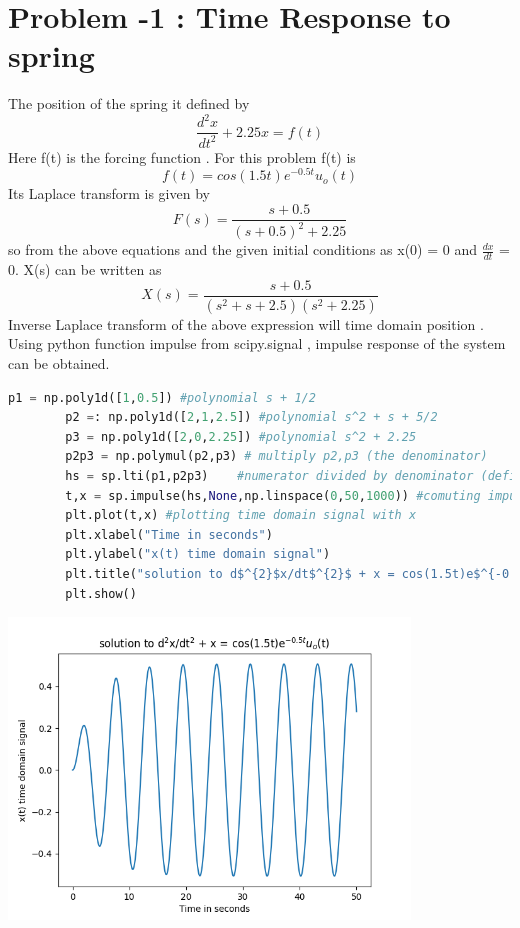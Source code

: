 \documentclass[a4paper]{article}
\begin{document}
\section{Problem -1 : Time Response to spring}
The position of the spring it defined by 
$$ \frac{d^{2}x}{dt^{2}} + 2.25x = f(t) $$
Here f(t) is the forcing function . For this problem f(t) is
$$ f(t) = cos(1.5t)e^{-0.5t}u_{o}(t) $$
Its Laplace transform is given by
$$ F(s) = \frac{s + 0.5}{(s + 0.5)^{2} + 2.25}$$
so from the above equations and the given initial conditions as x(0) = 0 and $\frac{dx}{dt}$ = 0.
X(s) can be written as
$$ X(s) = \frac{s + 0.5}{(s^{2} + s + 2.5)(s^{2} + 2.25)}$$
Inverse Laplace transform of the above expression will time domain position . Using python function impulse from scipy.signal , impulse response of the system can be obtained.  
\begin{lstlisting}[language=Python]
p1 = np.poly1d([1,0.5]) #polynomial s + 1/2
		p2 =: np.poly1d([2,1,2.5]) #polynomial s^2 + s + 5/2
		p3 = np.poly1d([2,0,2.25]) #polynomial s^2 + 2.25
		p2p3 = np.polymul(p2,p3) # multiply p2,p3 (the denominator)
		hs = sp.lti(p1,p2p3)	#numerator divided by denominator (defining transfer funtion)
		t,x = sp.impulse(hs,None,np.linspace(0,50,1000)) #comuting impulse response of the s domain transfer function
		plt.plot(t,x) #plotting time domain signal with x
		plt.xlabel("Time in seconds")
		plt.ylabel("x(t) time domain signal")
		plt.title("solution to d$^{2}$x/dt$^{2}$ + x = cos(1.5t)e$^{-0.5t}u_{o}$(t)")
		plt.show()
\end{lstlisting}
\begin{center}
\includegraphics[width=0.8\textwidth]{Figure_1.png}
\end{center}
\end{document}
